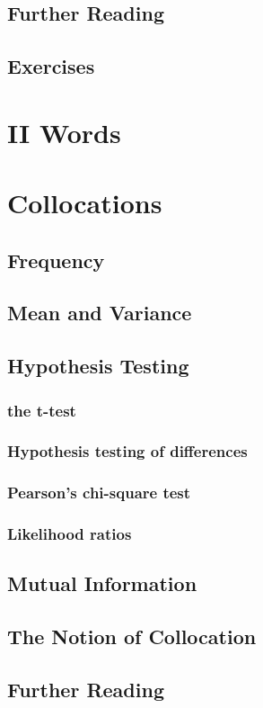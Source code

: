 \documentclass[a4paper]{article}
\begin{document}
\subsection{Further Reading}
\subsection{Exercises}
\newpage
\section*{II Words}
\section{Collocations}
\subsection{Frequency}
\subsection{Mean and Variance}
\subsection{Hypothesis Testing}
\subsubsection{the t-test}
\subsubsection{Hypothesis testing of differences}
\subsubsection{Pearson's chi-square test}
\subsubsection{Likelihood ratios}
\subsection{Mutual Information}
\subsection{The Notion of Collocation}
\subsection{Further Reading}
\newpage
\end{document}
